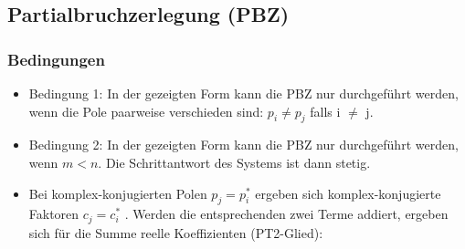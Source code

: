\subsection{Partialbruchzerlegung (PBZ) }
\subsubsection{Bedingungen}
\begin{itemize}
\item Bedingung 1: In der gezeigten Form kann die PBZ nur durchgeführt werden,
wenn die Pole paarweise verschieden sind: $p_{i} \neq p_{j}$ falls i $\neq$ j.
\item Bedingung 2: In der gezeigten Form kann die PBZ nur durchgeführt werden, wenn $m < n$. Die Schrittantwort des Systems ist dann stetig.
\item Bei komplex-konjugierten Polen $p_{j} = p^{\ast}_{i}$ ergeben sich komplex-konjugierte Faktoren
$c_{j} = c^{\ast}_{i}$ . Werden die entsprechenden zwei Terme addiert, ergeben sich
für die Summe reelle Koeffizienten (PT2-Glied):
\end{itemize}
